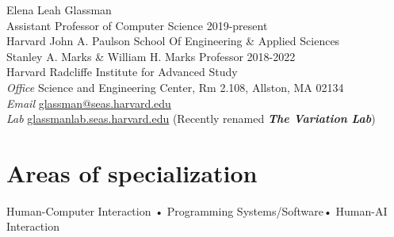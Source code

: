 \documentclass[10pt, a4paper]{article}
\begin{document}
{\LARGE Elena Leah Glassman}\\[0.25cm]
{\large Assistant Professor of Computer Science \hfill 2019-present\\ 
Harvard John A. Paulson School Of Engineering \& Applied Sciences\\
[0.1cm]
Stanley A. Marks \& William H. Marks Professor \hfill 2018-2022 \\
Harvard Radcliffe Institute for Advanced Study}\\[0.4cm]
\textit{Office} Science and Engineering Center, Rm 2.108, Allston, MA 02134\\%
\textit{Email} \href{mailto:glassman@seas.harvard.edu}{glassman@seas.harvard.edu} \\
\textit{Lab} \href{http://glassmanlab.seas.harvard.edu/}{glassmanlab.seas.harvard.edu} (Recently renamed \textit{\textbf{The Variation Lab}})

\section*{Areas of specialization}
Human-Computer Interaction • Programming Systems/Software• Human-AI Interaction
\end{document}
